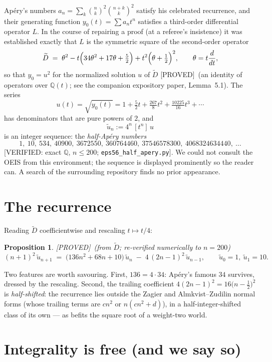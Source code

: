 \documentclass[11pt,reqno]{amsart}
\theoremstyle{plain}
\newtheorem{proposition}[theorem]{Proposition}
\theoremstyle{definition}
\theoremstyle{remark}
\newcommand{\Q}{\mathbb{Q}}
\newcommand{\bin}[2]{\binom{#1}{#2}}
\newcommand{\ut}{\tilde u}
\newcommand{\Proved}{\textup{\textsf{[PROVED]}}}
\newcommand{\VerifiedR}[1]{\textup{\textsf{[VERIFIED: #1]}}}
\begin{document}
Ap\'ery's numbers $a_n=\sum_k\bin nk^2\bin{n+k}k^2$ satisfy his celebrated
recurrence, and their generating function $y_0(t)=\sum a_nt^n$ satisfies a
third-order differential operator $L$. In the course of repairing a proof
(at a referee's insistence) it was established exactly that $L$ is the
symmetric square of the second-order operator
\[
\widetilde D \;=\; \theta^2 - t\Bigl(34\theta^2+17\theta+\tfrac52\Bigr)
+ t^2\Bigl(\theta+\tfrac12\Bigr)^2,
\qquad \theta=t\frac{d}{dt},
\]
so that $y_0=u^2$ for the normalized solution $u$ of $\widetilde D$
\Proved\ (an identity of operators over $\Q(t)$; see the companion
expository paper, Lemma~5.1). The series
\[
u(t)=\sqrt{y_0(t)}=1+\tfrac52t+\tfrac{267}8t^2+\tfrac{10225}{16}t^3+\cdots
\]
has denominators that are pure powers of $2$, and
\[
\ut_n := 4^n\,[t^n]\,u
\]
is an integer sequence: the \emph{half-Ap\'ery numbers}
\[
1,\ 10,\ 534,\ 40900,\ 3672550,\ 360764460,\ 37546578300,\
4068324634440,\ \dots
\]
\VerifiedR{exact $\Q$, $n\le200$; \texttt{eps56\_half\_apery.py}}.
We could not consult the OEIS from this environment; the sequence is
displayed prominently so the reader can. A search of the surrounding
repository finds no prior appearance.

\section{The recurrence}

Reading $\widetilde D$ coefficientwise and rescaling $t\mapsto t/4$:

\begin{proposition}\label{prop:rec}
\Proved\ (from $\widetilde D$; re-verified numerically to $n=200$)
\[
(n+1)^2\,\ut_{n+1} \;=\; \bigl(136n^2+68n+10\bigr)\,\ut_n
\;-\;4\,(2n-1)^2\,\ut_{n-1},
\qquad \ut_0=1,\ \ut_1=10 .
\]
\end{proposition}

Two features are worth savouring. First, $136=4\cdot34$: Ap\'ery's famous
$34$ survives, dressed by the rescaling. Second, the trailing coefficient
$4(2n-1)^2=16\bigl(n-\tfrac12\bigr)^2$ is \emph{half-shifted}: the
recurrence lies outside the Zagier and Almkvist--Zudilin normal forms
(whose trailing terms are $cn^2$ or $n(cn^2+d)$), in a half-integer-shifted
class of its own --- as befits the square root of a weight-two world.

\section{Integrality is free (and we say so)}
\end{document}
